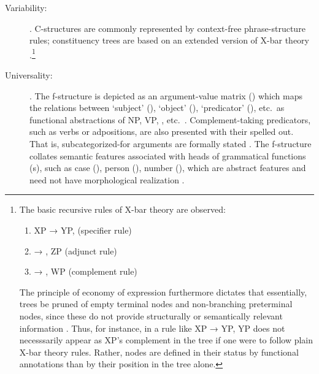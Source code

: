 \begin{description}
\item[Variability:] . 
C-structures are commonly represented by context-free phrase-structure rules;
constituency trees are based on an extended version of X-bar theory \citep[42]{bresnan2016}.\footnote{The basic recursive rules of X-bar
theory are observed:
\begin{enumerate}[nosep, leftmargin={2\footnotemargin}]
\item XP → YP,  (specifier rule)
\item {} → , ZP (adjunct rule)
\item {} → , WP (complement rule)
\end{enumerate}

The principle of economy of expression furthermore dictates that essentially,
trees be pruned of empty terminal nodes and non-branching preterminal nodes,
since these do not provide structurally or semantically relevant information
\citep[119--128]{bresnan2016}. Thus, for instance, in a rule like XP →
 YP, YP does not necesssarily appear as XP's complement in the tree if
one were to follow plain X-bar theory rules. Rather, nodes
are defined in their status by functional annotations than by their position in
the tree alone.}

\item[Universality:] . The f-structure is depicted
as an argument-value matrix (\Avm{}) which maps the relations between `subject'
(\Subj{}), `object' (\Obj{}), `predicator' (\Pred{}), etc.\ as functional
abstractions of NP, VP, , etc.\ \citep[42]{bresnan2016}.
Complement-taking predicators, such as verbs or adpositions, are also presented
with their  spelled out. That is, subcategorized-for arguments
are formally stated \citep[15]{bresnan2016}. The f-structure collates semantic
features associated with heads of grammatical functions (\GF{}s), such as case
(\Case{}), person (\Pers{}), number (\Num{}), which are abstract features and
need not have morphological realization \citep[43]{bresnan2016}.


\end{description}
